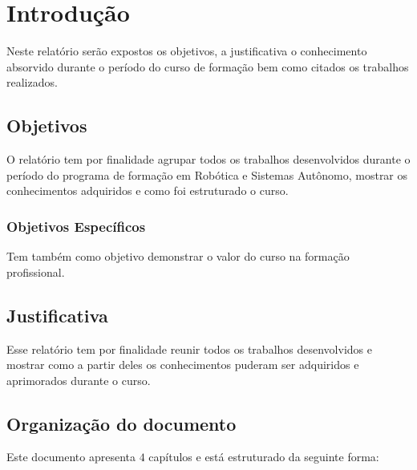 \chapter{Introdução}
\label{chap:intro}

Neste relatório serão expostos os objetivos, a justificativa  o conhecimento absorvido durante o período do curso de formação bem como citados os trabalhos realizados.

\section{Objetivos}
\label{sec:obj}

O relatório tem por finalidade agrupar todos os trabalhos desenvolvidos durante o período do programa de formação em Robótica e Sistemas Autônomo, mostrar os conhecimentos adquiridos e como foi estruturado o curso.


\subsection{Objetivos Específicos}
\label{ssec:objesp}

Tem também como objetivo demonstrar o valor do curso na formação profissional.



\section{Justificativa}
\label{sec:justi}

Esse relatório tem por finalidade reunir todos os trabalhos desenvolvidos e mostrar como a partir deles os conhecimentos puderam ser adquiridos e aprimorados durante o curso. 





\section{Organização do documento}
\label{section:organizacao}

Este documento apresenta $4$ capítulos e está estruturado da seguinte forma:


